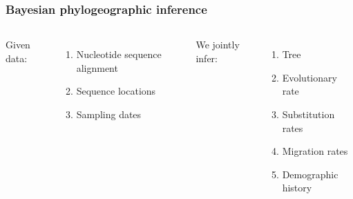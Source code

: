 \documentclass{beamer}
\begin{document}
\begin{frame}

  \frametitle{Bayesian phylogeographic inference}

  \begin{columns}[c]

      Given data:
      \begin{enumerate}
        \item Nucleotide sequence alignment %
        \item Sequence locations %
        \item Sampling dates %
      \end{enumerate}

      We jointly infer:
      \begin{enumerate}
        \item Tree %
        \item Evolutionary rate
        \item Substitution rates %
        \item Migration rates %
        \item Demographic history %
      \end{enumerate}

  \end{columns}


\end{frame}

\end{document}
